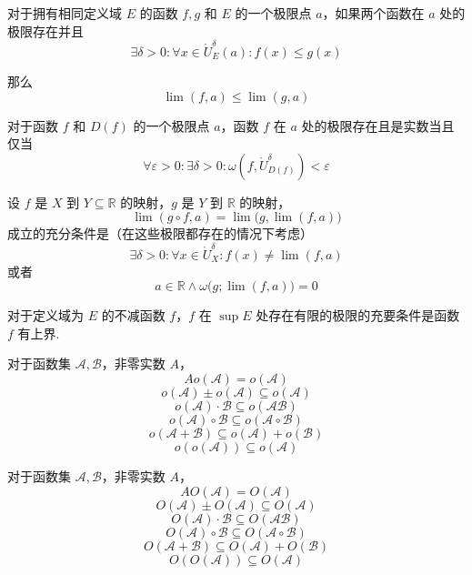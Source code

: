 \begin{theorem}
    对于拥有相同定义域 $E$ 的函数 $f,g$ 和 $E$ 的一个极限点 $a$，如果两个函数在 $a$ 处的极限存在并且
    \[\exists \delta > 0: \forall x \in \mathring{U}_E^\delta(a): f(x) \leqslant g(x)\]

    那么
    \[\lim(f,a) \leqslant \lim(g,a)\]
\end{theorem}\vspace{9pt}

\begin{theorem}
    对于函数 $f$ 和 $D(f)$ 的一个极限点 $a$，函数 $f$ 在 $a$ 处的极限存在且是实数当且仅当
    \[\forall \varepsilon > 0: \exists \delta > 0: \omega(f,\mathring{U}_{D(f)}^\delta) < \varepsilon\]
\end{theorem}\vspace{9pt}

\begin{theorem}
    设 $f$ 是 $X$ 到 $Y \subseteq \mathbb{R}$ 的映射，$g$ 是 $Y$ 到 $\mathbb{R}$ 的映射，
    \[\lim(g \circ f,a) = \lim\bigl(g, \lim(f,a)\bigr)\]
    成立的充分条件是（在这些极限都存在的情况下考虑）
    \[\exists \delta > 0: \forall x \in \mathring{U}_X^\delta: f(x) \neq \lim(f,a)\]
    或者
    \[a \in \mathbb{R} \wedge \omega\bigl(g;\lim(f,a)\bigr) = 0\]
\end{theorem}\vspace{9pt}

\begin{theorem}
    对于定义域为 $E$ 的不减函数 $f$，$f$ 在 $\sup E$ 处存在有限的极限的充要条件是函数 $f$ 有上界.
\end{theorem}\vspace{9pt}

\begin{theorem}
    对于函数集 $\mathcal{A}, \mathcal{B}$，非零实数 $A$，
    \[Ao(\mathcal{A}) = o(\mathcal{A}) \tag{1}\]
    \[o(\mathcal{A}) \pm o(\mathcal{A}) \subseteq o(\mathcal{A}) \tag{2}\]
    \[o(\mathcal{A}) \cdot \mathcal{B} \subseteq o(\mathcal{AB}) \tag{3}\]
    \[o(\mathcal{A}) \circ \mathcal{B} \subseteq o(\mathcal{A} \circ \mathcal{B}) \tag{4}\]
    \[o(\mathcal{A} + \mathcal{B}) \subseteq o(\mathcal{A}) + o(\mathcal{B}) \tag{5}\]
    \[o(o(\mathcal{A})) \subseteq o(\mathcal{A}) \tag{6}\]
\end{theorem}\vspace{9pt}

\begin{theorem}
    对于函数集 $\mathcal{A}, \mathcal{B}$，非零实数 $A$，
    \[AO(\mathcal{A}) = O(\mathcal{A}) \tag{1}\]
    \[O(\mathcal{A}) \pm O(\mathcal{A}) \subseteq O(\mathcal{A}) \tag{2}\]
    \[O(\mathcal{A}) \cdot \mathcal{B} \subseteq O(\mathcal{AB}) \tag{3}\]
    \[O(\mathcal{A}) \circ \mathcal{B} \subseteq O(\mathcal{A} \circ \mathcal{B}) \tag{4}\]
    \[O(\mathcal{A} + \mathcal{B}) \subseteq O(\mathcal{A}) + O(\mathcal{B}) \tag{5}\]
    \[O(O(\mathcal{A})) \subseteq O(\mathcal{A}) \tag{6}\]
\end{theorem}

